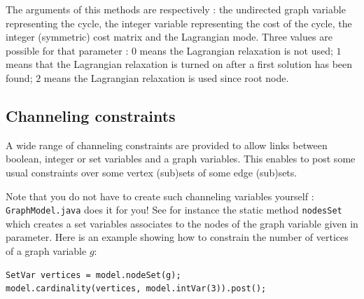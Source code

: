 \documentclass{article}
\begin{document}
The arguments of this methods are respectively : the undirected graph variable representing the cycle, the integer variable representing the cost of the cycle, the integer (symmetric) cost matrix and the Lagrangian mode. Three values are possible for that parameter : $0$ means the Lagrangian relaxation is not used; $1$ means that the Lagrangian relaxation is turned on after a first solution has been found; $2$ means the Lagrangian relaxation is used since root node.

%
%

\subsection{Channeling constraints}

A wide range of channeling constraints are provided to allow links between boolean, integer or set variables and a graph variables. 
This enables to post some usual constraints over some vertex (sub)sets of some edge (sub)sets. 

Note that you do not have to create such channeling variables yourself : \texttt{GraphModel.java} does it for you! 
See for instance the static method \texttt{nodesSet} which creates a set variables associates to the nodes of the graph variable given in parameter. 
Here is an example showing how to constrain the number of vertices of a graph variable $g$: 

\begin{lstlisting}
SetVar vertices = model.nodeSet(g);
model.cardinality(vertices, model.intVar(3)).post();
\end{lstlisting}
\end{document}
